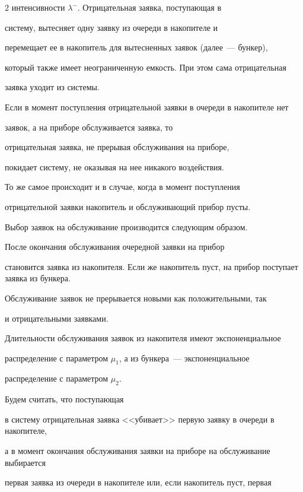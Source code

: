 \begin{multicols}{2}
интенсивности $\lambda^-$. Отрицательная заявка, поступающая в


систему, вытесняет одну заявку из очереди в накопителе и


перемещает ее в накопитель для вытесненных заявок (далее~--- бун\-кер),


который также имеет неограниченную емкость. При этом сама отрицательная


заявка уходит из системы.


Если в момент поступления отрицательной заявки в очереди в накопителе нет


заявок, а на приборе обслуживается заявка, то


отрицательная заявка, не прерывая обслуживания на приборе,


покидает сис\-те\-му, не оказывая на нее никакого воздействия.


То же самое происходит и в случае, когда в момент поступления


отрицательной заявки накопитель и обслуживающий прибор пусты.





Выбор заявок на обслуживание производится следующим образом.


После окончания обслуживания очередной заявки на прибор


становится заявка из накопителя. Если же накопитель пуст, на прибор поступает заявка из бункера.


Обслуживание заявок не прерывается новыми как положительными, так


и отрицательными заявками.





Длительности обслуживания заявок из накопителя имеют экспоненциальное


распределение с параметром $\mu_1$, а из бункера~--- экспоненциальное


распределение с параметром $\mu_2$.





Будем считать, что поступающая


в систему отрицательная заявка <<убивает>> первую заявку в очереди в накопителе,


а в момент окончания обслуживания заявки на приборе на обслуживание выбирается


первая заявка из очереди в накопителе или, если накопитель пуст, первая



\end{multicols}
